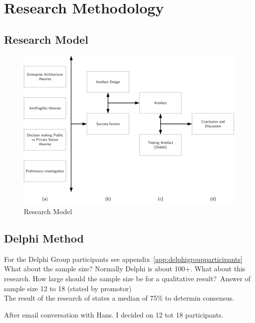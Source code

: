 \chapter{Research Methodology}
\label{ch:research-methodology}

\section{Research Model}
\label{sec:research-model}
	\begin{figure}[h]
		\centering
		\includegraphics[width=12cm]{images/research-model.png}
		\caption[Research Model]{Research Model}
		\label{fig:research-model}
	\end{figure}

\section{Delphi Method}
For the Delphi Group participants see appendix~\ref{app:delphigroupparticipants} \\%

What about the sample size? Normally Delphi is about 100+. What about this research. How large should the sample size be for a qualitative result?\
Answer of sample size 12 to 18 (stated by promotor)\\
The result of the research of \textcite[p. 404]{Diamond2014} states a median of 75\% to determin consensus.
\begin{remark}
	After email conversation with Hans. I decided on 12 tot 18 participants.
\end{remark}

